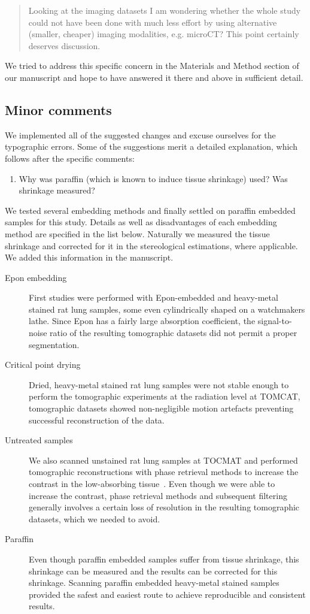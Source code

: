 \documentclass[english,paper=a4,DIV=calc]{scrartcl}
\begin{document}
\blockquote{Looking at the imaging datasets I am wondering whether the whole study could  not have been done with much less effort by using alternative (smaller, cheaper) imaging modalities, e.g. microCT? This point certainly deserves discussion.}
We tried to address this specific concern in the Materials and Method section of our manuscript and hope to have answered it there and above in sufficient detail.

\subsection{Minor comments}
We implemented all of the suggested changes and excuse ourselves for the typographic errors. Some of the suggestions merit a detailed explanation, which follows after the specific comments:

\begin{enumerate}[start=3]
	\item \textelp{} Why was paraffin (which is known to induce tissue shrinkage) used? Was shrinkage measured?
\end{enumerate}

We tested several embedding methods and finally settled on paraffin embedded samples for this study.
Details as well as disadvantages of each embedding method are specified in the list below.
Naturally we measured the tissue shrinkage and corrected for it in the stereological estimations, where applicable.
We added this information in the manuscript.

\begin{description}
	\item [Epon embedding] First studies were performed with Epon-embedded and heavy-metal stained rat lung samples, some even cylindrically shaped on a watchmakers lathe.
		Since Epon has a fairly large absorption coefficient, the signal-to-noise ratio of the resulting tomographic datasets did not permit a proper segmentation.
	\item [Critical point drying] Dried, heavy-metal stained rat lung samples were not stable enough to perform the tomographic experiments at the radiation level at TOMCAT, tomographic datasets showed non-negligible motion artefacts preventing successful reconstruction of the data.
	\item [Untreated samples] We also scanned unstained rat lung samples at TOCMAT and performed tomographic reconstructions with phase retrieval methods to increase the contrast in the low-absorbing tissue~\citep{Marone2011}.
	Even though we were able to increase the contrast, phase retrieval methods and subsequent filtering generally involves a certain loss of resolution in the resulting tomographic datasets, which we needed to avoid.
	\item [Paraffin] Even though paraffin embedded samples suffer from tissue shrinkage, this shrinkage can be measured and the results can be corrected for this shrinkage.
	Scanning paraffin embedded heavy-metal stained samples provided the safest and easiest route to achieve reproducible and consistent results.
\end{description}
\end{document}
